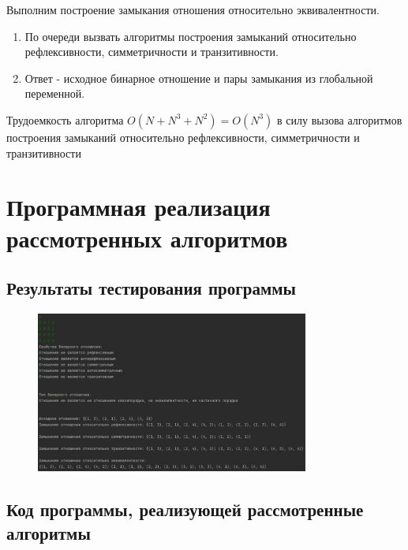 \documentclass[bachelor, och, labwork]{shiza}
\begin{document}
Выполним построение замыкания отношения относительно эквивалентности.

\begin{enumerate}
    \item По очереди вызвать алгоритмы построения замыканий относительно рефлексивности,
    симметричности и транзитивности.
    \item Ответ - исходное бинарное отношение и пары замыкания из глобальной переменной.
\end{enumerate}
Трудоемкость алгоритма $O(N+N^3 + N^2) = O(N^3)$ в силу вызова алгоритмов построения
замыканий относительно рефлексивности, симметричности и транзитивности

\section{Программная реализация рассмотренных алгоритмов}
    
    \subsection{Результаты тестирования программы}

        \begin{figure}[H]
            \centering
            \includegraphics[width=0.8\textwidth]{pic/1.jpg}
            \caption{}
        \end{figure}
    
    \subsection{Код программы, реализующей рассмотренные алгоритмы}
    
        \inputminted[linenos,breaklines=true, fontsize=\small, style=bw]{python}{code/lab1.py}

    
    
\end{document}
